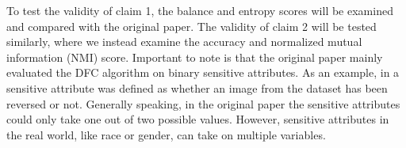    
    

To test the validity of claim 1, the balance and entropy scores will be examined and compared with the original paper. The validity of claim 2 will be tested similarly, where we instead examine the accuracy and normalized mutual information (NMI) score.
Important to note is that the original paper mainly evaluated the DFC algorithm on binary sensitive attributes. As an example, in \citet{Li_2020_CVPR} a sensitive attribute was defined as whether an image from the \mn dataset has been reversed or not. Generally speaking, in the original paper the sensitive attributes could only take one out of two possible values. However, sensitive attributes in the real world, like race or gender, can take on multiple variables. 

